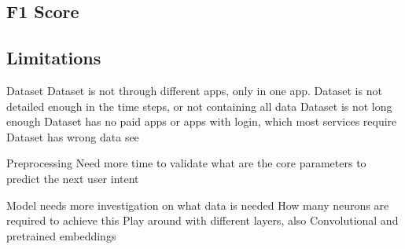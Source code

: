 \subsection{F1 Score}
\subsection{Limitations}

Dataset
Dataset is not through different apps, only in one app.
Dataset is not detailed enough in the time steps, or not containing all data
Dataset is not long enough
Dataset has no paid apps or apps with login, which most services require
Dataset has wrong data see \cite{clay}

Preprocessing
Need more time to validate what are the core parameters to predict the next user intent


Model needs more investigation on what data is needed
How many neurons are required to achieve this
Play around with different layers, also Convolutional and pretrained embeddings
